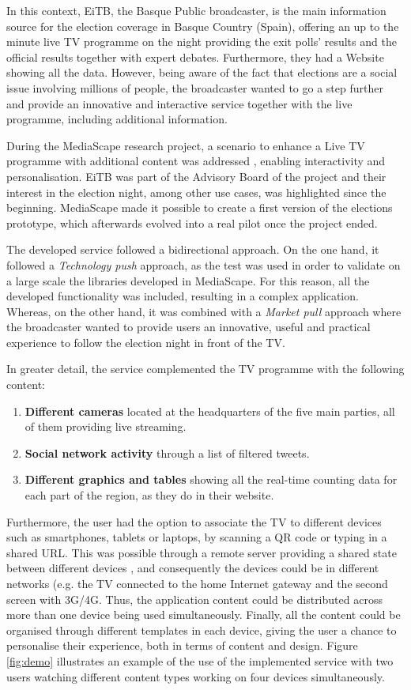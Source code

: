 In this context, EiTB, the Basque Public broadcaster, is the main information source for the election coverage in Basque Country (Spain), offering an up to the minute live TV programme on the night providing the exit polls' results and the official results together with expert debates. Furthermore, they had a Website showing all the data. However, being aware of the fact that elections are a social issue involving millions of people, the broadcaster wanted to go a step further and provide an innovative and interactive service together with the live programme, including additional information.

During the MediaScape research project, a scenario to enhance a Live TV programme with additional content was addressed \cite{D21}, enabling interactivity and personalisation. EiTB was part of the Advisory Board of the project and their interest in the election night, among other use cases, was highlighted since the beginning. MediaScape made it possible to create a first version of the elections prototype, which afterwards evolved into a real pilot once the project ended.

The developed service followed a bidirectional approach. On the one hand, it followed a \textit{Technology push} approach, as the test was used in order to validate on a large scale the libraries developed in MediaScape. For this reason, all the developed functionality was included, resulting in a complex application. Whereas, on the other hand, it was combined with a \textit{Market pull} approach where the broadcaster wanted to provide users an innovative, useful and practical experience to follow the election night in front of the TV.

In greater detail, the service complemented the TV programme with the following content:
\begin{enumerate}	
	\item \textbf{Different cameras} located at the headquarters of the five main parties, all of them providing live streaming.
	\item \textbf{Social network activity} through a list of filtered tweets.
	\item \textbf{Different graphics and tables} showing all the real-time counting data for each part of the region, as they do in their website.
\end{enumerate}

Furthermore, the user had the option to associate the TV to different devices such as smartphones, tablets or laptops, by scanning a QR code or typing in a shared URL. This was possible through a remote server providing a shared state between different devices \cite{Zorrilla2015}, and consequently the devices could be in different networks (e.g. the TV connected to the home Internet gateway and the second screen with 3G/4G. Thus, the application content could be distributed across more than one device being used simultaneously. Finally, all the content could be organised through different templates in each device, giving the user a chance to personalise their experience, both in terms of content and design. Figure \ref{fig:demo} illustrates an example of the use of the implemented service with two users watching different content types working on four devices simultaneously.

